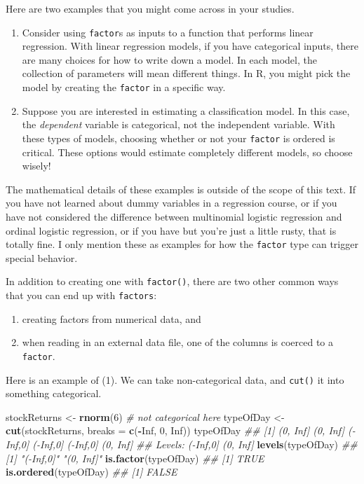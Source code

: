 \documentclass[12pt,krantz2]{krantz}
\makeatletter
\newenvironment{Shaded}{\begin{snugshade}}{\end{snugshade}}
\newcommand{\CommentTok}[1]{\textcolor[rgb]{0.37,0.37,0.37}{\textit{#1}}}
\newcommand{\DataTypeTok}[1]{\textcolor[rgb]{0.27,0.27,0.27}{#1}}
\newcommand{\DecValTok}[1]{\textcolor[rgb]{0.06,0.06,0.06}{#1}}
\newcommand{\KeywordTok}[1]{\textcolor[rgb]{0.27,0.27,0.27}{\textbf{#1}}}
\newcommand{\NormalTok}[1]{#1}
\newcommand{\OperatorTok}[1]{\textcolor[rgb]{0.43,0.43,0.43}{\textbf{#1}}}
\newcommand{\OtherTok}[1]{\textcolor[rgb]{0.37,0.37,0.37}{#1}}
\newcommand{\StringTok}[1]{\textcolor[rgb]{0.5,0.5,0.5}{#1}}
\providecommand{\tightlist}{%
  \setlength{\itemsep}{0pt}\setlength{\parskip}{0pt}}
\newenvironment{kframe}{%
\medskip{}
\setlength{\fboxsep}{.8em}
 \def\at@end@of@kframe{}%
 \ifinner\ifhmode%
  \def\at@end@of@kframe{\end{minipage}}%
  \begin{minipage}{\columnwidth}%
 \fi\fi%
 \def\FrameCommand##1{\hskip\@totalleftmargin \hskip-\fboxsep
 \colorbox{shadecolor}{##1}\hskip-\fboxsep
     \hskip-\linewidth \hskip-\@totalleftmargin \hskip\columnwidth}%
 \MakeFramed {\advance\hsize-\width
   \@totalleftmargin\z@ \linewidth\hsize
   \@setminipage}}%
 {\par\unskip\endMakeFramed%
 \at@end@of@kframe}
\renewenvironment{Shaded}{\begin{kframe}}{\end{kframe}}
\makeatother
\begin{document}
Here are two examples that you might come across in your studies.

\begin{enumerate}
\def\labelenumi{\arabic{enumi}.}
\item
  Consider using \texttt{factor}s as inputs to a function that performs linear regression. With linear regression models, if you have categorical inputs, there are many choices for how to write down a model. In each model, the collection of parameters will mean different things. In R, you might pick the model by creating the \texttt{factor} in a specific way.
\item
  Suppose you are interested in estimating a classification model. In this case, the \emph{dependent} variable is categorical, not the independent variable. With these types of models, choosing whether or not your \texttt{factor} is ordered is critical. These options would estimate completely different models, so choose wisely!
\end{enumerate}

The mathematical details of these examples is outside of the scope of this text. If you have not learned about dummy variables in a regression course, or if you have not considered the difference between multinomial logistic regression and ordinal logistic regression, or if you have but you're just a little rusty, that is totally fine. I only mention these as examples for how the \texttt{factor} type can trigger special behavior.

In addition to creating one with \texttt{factor()}, there are two other common ways that you can end up with \texttt{factors}:

\begin{enumerate}
\def\labelenumi{\arabic{enumi}.}
\tightlist
\item
  creating factors from numerical data, and
\item
  when reading in an external data file, one of the columns is coerced to a \texttt{factor}.
\end{enumerate}

Here is an example of (1). We can take non-categorical data, and \texttt{cut()} it into something categorical.

\begin{Shaded}
\begin{Highlighting}[]
\NormalTok{stockReturns <-}\StringTok{ }\KeywordTok{rnorm}\NormalTok{(}\DecValTok{6}\NormalTok{) }\CommentTok{# not categorical here}
\NormalTok{typeOfDay <-}\StringTok{ }\KeywordTok{cut}\NormalTok{(stockReturns, }\DataTypeTok{breaks =} \KeywordTok{c}\NormalTok{(}\OperatorTok{-}\OtherTok{Inf}\NormalTok{, }\DecValTok{0}\NormalTok{, }\OtherTok{Inf}\NormalTok{)) }
\NormalTok{typeOfDay}
\CommentTok{## [1] (0, Inf] (0, Inf] (-Inf,0] (-Inf,0] (-Inf,0] (0, Inf]}
\CommentTok{## Levels: (-Inf,0] (0, Inf]}
\KeywordTok{levels}\NormalTok{(typeOfDay)}
\CommentTok{## [1] "(-Inf,0]" "(0, Inf]"}
\KeywordTok{is.factor}\NormalTok{(typeOfDay)}
\CommentTok{## [1] TRUE}
\KeywordTok{is.ordered}\NormalTok{(typeOfDay)}
\CommentTok{## [1] FALSE}
\end{Highlighting}
\end{Shaded}
\end{document}
